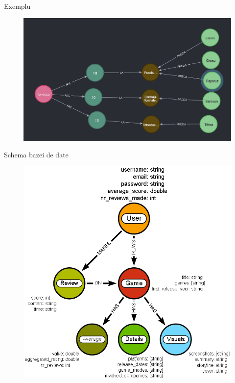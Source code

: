 \documentclass{beamer}
\begin{document}
\begin{frame}[fragile]{Exemplu}
    \begin{figure}[H]
        \centering
        \begin{adjustbox}{max size={\textwidth}{\textheight}}
        \includegraphics[scale = 0.4]{exemplu_3}
        \end{adjustbox}
    \end{figure}
\end{frame}

\begin{frame}{Schema bazei de date}
    \begin{figure}[H]
        \centering
        \begin{adjustbox}{max size={\textwidth}{\textheight}}
        \includegraphics[scale = 0.3]{exemplu_4}
        \end{adjustbox}
    \end{figure}
\end{frame}
\end{document}
